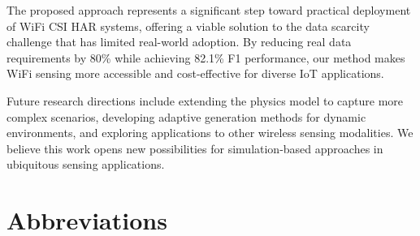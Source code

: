 \documentclass[journal]{IEEEtran}
\begin{document}
The proposed approach represents a significant step toward practical deployment of WiFi CSI HAR systems, offering a viable solution to the data scarcity challenge that has limited real-world adoption. By reducing real data requirements by 80\% while achieving 82.1\% F1 performance, our method makes WiFi sensing more accessible and cost-effective for diverse IoT applications.

Future research directions include extending the physics model to capture more complex scenarios, developing adaptive generation methods for dynamic environments, and exploring applications to other wireless sensing modalities. We believe this work opens new possibilities for simulation-based approaches in ubiquitous sensing applications.

\section*{Abbreviations}
\end{document}
